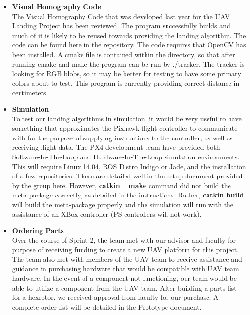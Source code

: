 \begin{itemize}
\item \textbf{Visual Homography Code}\\
 The Visual Homography Code that was developed last year for the UAV Landing Project has been reviewed. The program successfully builds and much of it is likely to be reused towards providing the landing algorithm. The code can be found \href{https://github.com/SDSMT-CSC464-F15/landingpad/tree/master/2014-2015/led}{here} in the repository. The code requires that OpenCV has been installed. A cmake file is contained within the directory, so that after running cmake and make the program can be run by ./tracker. The tracker is looking for RGB blobs, so it may be better for testing to have some primary colors about to test. This program is currently providing correct distance in centimeters. 
\item \textbf{Simulation} \\
To test our landing algorithms in simulation, it would be very useful to have something that approximates the Pixhawk flight controller to communicate with for the purpose of supplying instructions to the controller, as well as receiving flight data. The PX4 development team have provided both Software-In-The-Loop and Hardware-In-The-Loop simulation environments. This will require Linux 14.04, ROS Distro Indigo or Jade, and the installation of a few repositories. These are detailed well in the setup document provided by the group \href{https://pixhawk.org/dev/ros/sitl#px4_ros_sitl_setup}{here}. However, \textbf{catkin\_ make} command did not build the meta-package correctly, as detailed in the instructions. Rather, \textbf{catkin build} will build the meta-package properly and the simulation will run with the assistance of an XBox controller (PS controllers will not work).
 \item \textbf{Ordering Parts} \\
 Over the course of Sprint 2, the team met with our advisor and faculty for purpose of receiving funding to create a new UAV platform for this project. The team also met with members of the UAV team to receive assistance and guidance in purchasing hardware that would be compatible with UAV team hardware. In the event of a component not functioning, our team would be able to utilize a component from the UAV team. After building a parts list for a hexrotor, we received approval from faculty for our purchase. A complete order list will be detailed in the Prototype document.
\end{itemize}